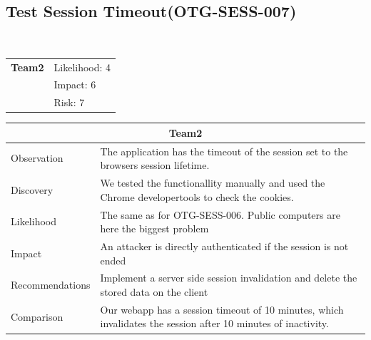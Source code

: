 \documentclass[headsepline,footsepline,footinclude=false,oneside,fontsize=11pt,paper=a4,listof=totoc,bibliography=totoc]{scrbook} %
\begin{document}
\pagebreak
\subsection{Test Session Timeout(OTG-SESS-007)}\

\begin{tabular}{cR{12cm}}
	\textbf{Team2} & Likelihood: 4\\& Impact: 6\\& Risk: 7
\end{tabular}

\begin{tabular}{ l|p{11cm}  }
	\hline
	\multicolumn{2}{c}{\textbf{Team2}} \\
	\hline
	Observation & The application has the timeout of the session set to the browsers
	session lifetime.\\
	Discovery & We tested the functionallity manually and used the Chrome developertools to check the cookies.\\
	Likelihood & The same as for OTG-SESS-006. Public computers are here the biggest problem\\
	Impact & An attacker is directly authenticated if the session is not ended\\
	Recommendations & Implement a server side session invalidation and delete the stored data on the client\\
	Comparison & Our webapp has a session timeout of 10 minutes, which invalidates the session after 10 minutes of inactivity.\\
	\hline
\end{tabular}
\\
\vspace{0.5cm}
\\
\end{document}
